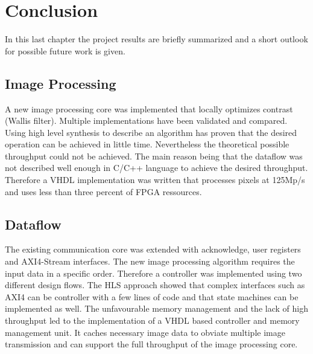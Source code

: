 %
%
\chapter{Conclusion}
In this last chapter the project results are briefly summarized and
a short outlook for possible future work is given.

%
%
\section{Image Processing}
A new image processing core was implemented that locally optimizes contrast 
(Wallis filter). Multiple implementations have been validated and compared.
Using high level synthesis to describe an algorithm has proven that the desired
operation can be achieved in little time. Nevertheless the theoretical possible
throughput could not be achieved. The main reason being that the dataflow was
not described well enough in C/C++ language to achieve the desired throughput.
Therefore a VHDL implementation was written that processes pixels at 125Mp/s and
uses less than three percent of FPGA ressources.

%
%
\section{Dataflow}
The existing communication core was extended with acknowledge, user registers
and AXI4-Stream interfaces. The new image processing algorithm requires the
input data in a specific order. Therefore a controller was implemented using two
different design flows. The HLS approach showed that complex interfaces such as
AXI4 can be controller with a few lines of code and that state machines can be
implemented as well. The unfavourable memory management and the lack of high
throughput
led to the implementation of a VHDL based controller and memory management unit.
It caches necessary image data to obviate multiple image transmission and can
support the full throughput of the image processing core.

